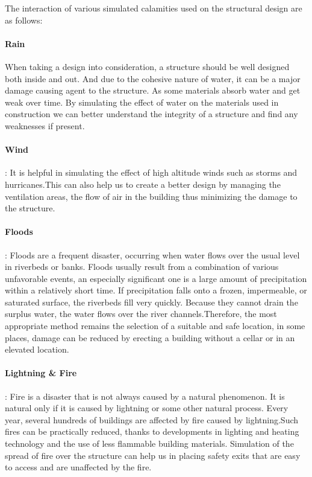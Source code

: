 \documentclass[conference]{IEEEtran}
\begin{document}
The interaction of various simulated calamities used on the structural design are as follows:
\paragraph{Rain}  When taking a design into consideration, a structure should be well designed both inside and out. And due to the cohesive nature of water, it can be a major damage causing agent to the structure. As some materials absorb water and get weak over time. By simulating the effect of water on the materials used in construction we can better understand the integrity of a structure and find any weaknesses if present.

\paragraph{Wind}: It is helpful in simulating the effect of high altitude winds such as storms and hurricanes.This can also help us to create a better design by managing the ventilation areas, the flow of air in the building thus minimizing the damage to the structure.   

\paragraph{Floods}: Floods are a frequent disaster, occurring when water flows over the usual level in riverbeds or banks. Floods usually result from a combination of various unfavorable events, an especially significant one is a large amount of precipitation within a relatively short time. If precipitation falls onto a frozen, impermeable, or saturated surface, the riverbeds fill very quickly. Because they cannot drain the surplus water,
the water flows over the river channels.Therefore, the most appropriate method remains the selection of a suitable and safe location, in some places, damage can be reduced by erecting a building without a cellar or in an elevated location.

\paragraph{Lightning \& Fire}: Fire is a disaster that is not always caused by a natural phenomenon. It is natural only if it is caused by
lightning or some other natural process. Every year, several hundreds of buildings are affected by fire caused by lightning.Such fires can be practically reduced, thanks to developments in lighting and heating technology and the use of less flammable building materials. Simulation of the spread of fire over the structure can help us in placing safety exits that are easy to access and are unaffected by the fire.
\end{document}
